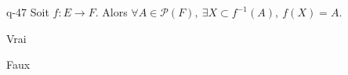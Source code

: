 \begin{truefalse}{q-47}
Soit $f:E\to F$. Alors $\forall A\in\mathcal{P}(F),\ \exists X\subset f^{-1}(A),\ f(X)=A$.
\item Vrai
\item* Faux
\end{truefalse}

